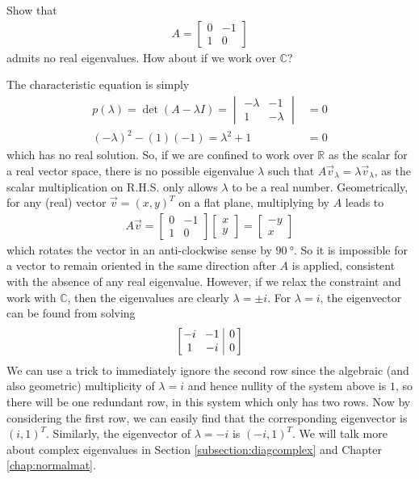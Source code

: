 \begin{exmp}
\label{exmp:norealeig}
Show that 
\begin{align*}
A = \begin{bmatrix}
0 & -1 \\
1 & 0 
\end{bmatrix}
\end{align*}
admits no real eigenvalues. How about if we work over $\mathbb{C}$?
\end{exmp}
\begin{solution}
The characteristic equation is simply
\begin{align*}
p(\lambda) = \det(A-\lambda I) = \begin{vmatrix}
-\lambda & -1 \\
1 & -\lambda
\end{vmatrix} &= 0 \\
(-\lambda)^2 - (1)(-1) = \lambda^2 + 1 &= 0
\end{align*}
which has no real solution. So, if we are confined to work over $\mathbb{R}$ as the scalar for a real vector space, there is no possible eigenvalue $\lambda$ such that $A\vec{v}_\lambda = \lambda\vec{v}_\lambda$, as the scalar multiplication on R.H.S. only allows $\lambda$ to be a real number. Geometrically, for any (real) vector $\vec{v} = (x,y)^T$ on a flat plane, multiplying by $A$ leads to
\begin{align*}
A\vec{v} = 
\begin{bmatrix}
0 & -1 \\
1 & 0 
\end{bmatrix}
\begin{bmatrix}
x \\
y
\end{bmatrix}
=
\begin{bmatrix}
-y \\
x
\end{bmatrix}
\end{align*}
which rotates the vector in an anti-clockwise sense by $\SI{90}{\degree}$. So it is impossible for a vector to remain oriented in the same direction after $A$ is applied, consistent with the absence of any real eigenvalue. However, if we relax the constraint and work with $\mathbb{C}$, then the eigenvalues are clearly $\lambda = \pm i$. For $\lambda = i$, the eigenvector can be found from solving
\begin{align*}
\left[\begin{array}{@{\,}wc{10pt}wc{10pt}|c@{\,}}
-i & -1 & 0\\
1 &-i & 0
\end{array}\right]
\end{align*}
We can use a trick to immediately ignore the second row since the algebraic (and also geometric) multiplicity of $\lambda = i$ and hence nullity of the system above is $1$, so there will be one redundant row, in this system which only has two rows. Now by considering the first row, we can easily find that the corresponding eigenvector is $(i,1)^T$. Similarly, the eigenvector of $\lambda = -i$ is $(-i,1)^T$. We will talk more about complex eigenvalues in Section \ref{subsection:diagcomplex} and Chapter \ref{chap:normalmat}.
\end{solution}


